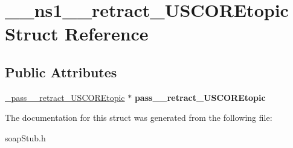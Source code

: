 \hypertarget{struct____ns1____retract__USCOREtopic}{
\section{\_\-\_\-ns1\_\-\_\-retract\_\-USCOREtopic Struct Reference}
\label{struct____ns1____retract__USCOREtopic}
}
\subsection*{Public Attributes}
\begin{DoxyCompactItemize}
\item 
\hypertarget{struct____ns1____retract__USCOREtopic_a666343b3da540ede79c4ee8021deebf1}{
\hyperlink{class__pass____retract__USCOREtopic}{\_\-pass\_\-\_\-retract\_\-USCOREtopic} $\ast$ {\bfseries pass\_\-\_\-retract\_\-USCOREtopic}}
\label{struct____ns1____retract__USCOREtopic_a666343b3da540ede79c4ee8021deebf1}

\end{DoxyCompactItemize}


The documentation for this struct was generated from the following file:\begin{DoxyCompactItemize}
\item 
soapStub.h\end{DoxyCompactItemize}

